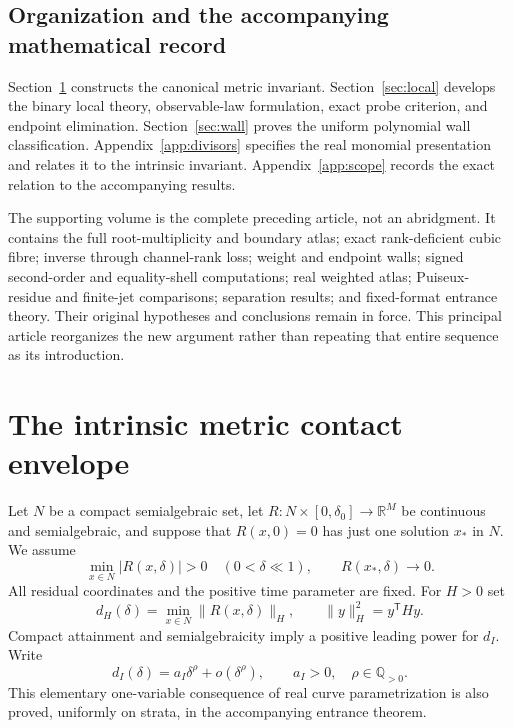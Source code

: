 \documentclass[11pt,reqno]{amsart}
\numberwithin{equation}{section}
\theoremstyle{definition}
\theoremstyle{remark}
\newcommand{\R}{\mathbb R}
\begin{document}
\subsection*{Organization and the accompanying mathematical record}
Section~\ref{sec:metric} constructs the canonical metric invariant. Section~\ref{sec:local} develops the binary local theory, observable-law formulation, exact probe criterion, and endpoint elimination. Section~\ref{sec:wall} proves the uniform polynomial wall classification. Appendix~\ref{app:divisors} specifies the real monomial presentation and relates it to the intrinsic invariant. Appendix~\ref{app:scope} records the exact relation to the accompanying results.

The supporting volume is the complete preceding article, not an abridgment. It contains the full root-multiplicity and boundary atlas; exact rank-deficient cubic fibre; inverse through channel-rank loss; weight and endpoint walls; signed second-order and equality-shell computations; real weighted atlas; Puiseux-residue and finite-jet comparisons; separation results; and fixed-format entrance theory. Their original hypotheses and conclusions remain in force. This principal article reorganizes the new argument rather than repeating that entire sequence as its introduction.

\section{The intrinsic metric contact envelope}\label{sec:metric}
Let $N$ be a compact semialgebraic set, let $R:N\times[0,\delta_0]\to\R^M$ be continuous and semialgebraic, and suppose that $R(x,0)=0$ has just one solution $x_*$ in $N$. We assume
\begin{equation}\label{eq:nonexact}
 \min_{x\in N}|R(x,\delta)|>0\quad(0<\delta\ll1),
 \qquad R(x_*,\delta)\longrightarrow0.
\end{equation}
All residual coordinates and the positive time parameter are fixed. For $H>0$ set
\[
 d_H(\delta)=\min_{x\in N}\|R(x,\delta)\|_H,
 \qquad \|y\|_H^2=y^{\mathsf T}Hy.
\]
Compact attainment and semialgebraicity imply a positive leading power for $d_I$. Write
\begin{equation}\label{eq:rho-definition}
 d_I(\delta)=a_I\delta^\rho+o(\delta^\rho),\qquad a_I>0,
 \quad \rho\in\mathbb Q_{>0}.
\end{equation}
This elementary one-variable consequence of real curve parametrization is also proved, uniformly on strata, in the accompanying entrance theorem.
\end{document}
